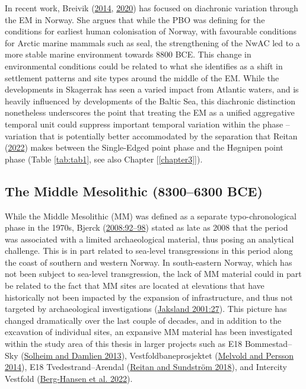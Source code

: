 \documentclass[
  12pt,
  a4paper,
  oneside]{book}
\begin{document}
In recent work, Breivik (\protect\hyperlink{ref-breivik2014}{2014}, \protect\hyperlink{ref-breivik2020}{2020}) has focused on diachronic variation through the EM in Norway. She argues that while the PBO was defining for the conditions for earliest human colonisation of Norway, with favourable conditions for Arctic marine mammals such as seal, the strengthening of the NwAC led to a more stable marine environment towards 8800 BCE. This change in environmental conditions could be related to what she identifies as a shift in settlement patterns and site types around the middle of the EM. While the developments in Skagerrak has seen a varied impact from Atlantic waters, and is heavily influenced by developments of the Baltic Sea, this diachronic distinction nonetheless underscores the point that treating the EM as a unified aggregative temporal unit could suppress important temporal variation within the phase -- variation that is potentially better accommodated by the separation that Reitan (\protect\hyperlink{ref-reitan2022}{2022}) makes between the Single-Edged point phase and the Høgnipen point phase (Table \ref{tab:tab1}, see also Chapter {[}\ref{chapter3}{]}).

\hypertarget{the-middle-mesolithic-83006300-bce}{%
\subsection{The Middle Mesolithic (8300--6300 BCE)}\label{the-middle-mesolithic-83006300-bce}}

While the Middle Mesolithic (MM) was defined as a separate typo-chronological phase in the 1970s, Bjerck (\protect\hyperlink{ref-bjerck2008}{2008:92--98}) stated as late as 2008 that the period was associated with a limited archaeological material, thus posing an analytical challenge. This is in part related to sea-level transgressions in this period along the coast of southern and western Norway. In south-eastern Norway, which has not been subject to sea-level transgression, the lack of MM material could in part be related to the fact that MM sites are located at elevations that have historically not been impacted by the expansion of infrastructure, and thus not targeted by archaeological investigations (\protect\hyperlink{ref-jaksland2001}{Jaksland 2001:27}). This picture has changed dramatically over the last couple of decades, and in addition to the excavation of individual sites, an expansive MM material has been investigated within the study area of this thesis in larger projects such as E18 Bommestad--Sky (\protect\hyperlink{ref-solheim2013c}{Solheim and Damlien 2013}), Vestfoldbaneprosjektet (\protect\hyperlink{ref-melvold2014b}{Melvold and Persson 2014}), E18 Tvedestrand--Arendal (\protect\hyperlink{ref-reitan2018c}{Reitan and Sundström 2018}), and Intercity Vestfold (\protect\hyperlink{ref-berg-hansen2022}{Berg-Hansen et al. 2022}).
\end{document}
